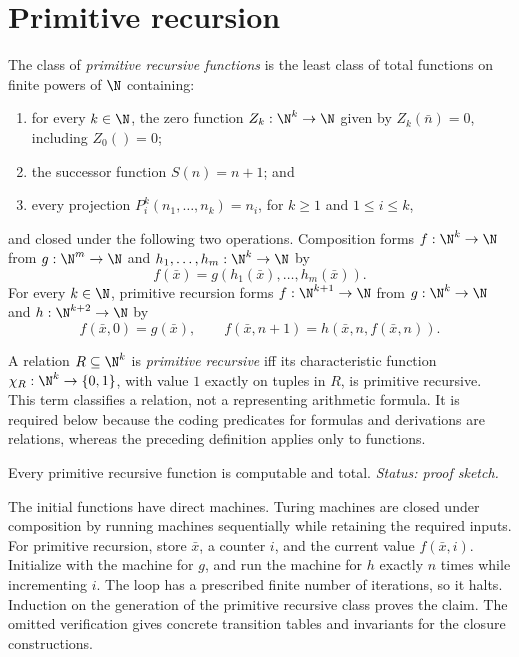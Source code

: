 \section{Primitive recursion}
\label{sec:turing-machines-02}

\begin{definition}
The class of \emph{primitive recursive functions} is the least class of total
functions on finite powers of \(\N\) containing:
\begin{enumerate}
  \item for every \(k\in\N\), the zero function
        \(Z_k:\N^k\to\N\) given by \(Z_k(\bar n)=0\), including
        \(Z_0()=0\);
  \item the successor function \(S(n)=n+1\); and
  \item every projection \(P_i^k(n_1,\ldots,n_k)=n_i\), for
        \(k\geq1\) and \(1\leq i\leq k\),
\end{enumerate}
and closed under the following two operations.  Composition forms
\(f:\N^k\to\N\) from \(g:\N^m\to\N\) and
\(h_1,\ldots,h_m:\N^k\to\N\) by
\[
  f(\bar x)=g(h_1(\bar x),\ldots,h_m(\bar x)).
\]
For every \(k\in\N\), primitive recursion forms
\(f:\N^{k+1}\to\N\) from \(g:\N^k\to\N\) and
\(h:\N^{k+2}\to\N\) by
\[
  f(\bar x,0)=g(\bar x),
  \qquad
  f(\bar x,n+1)=h(\bar x,n,f(\bar x,n)).
\]
\end{definition}

\begin{definition}
A relation \(R\subseteq\N^k\) is \emph{primitive recursive} iff its
characteristic function \(\chi_R:\N^k\to\{0,1\}\), with value \(1\) exactly
on tuples in \(R\), is primitive recursive.  This term classifies a relation,
not a representing arithmetic formula.  It is required below because the
coding predicates for formulas and derivations are relations, whereas the
preceding definition applies only to functions.
\end{definition}

\begin{theorem}
Every primitive recursive function is computable and total.
\textit{Status: proof sketch.}
\end{theorem}

\begin{proofplan}
The initial functions have direct machines.  Turing machines are closed under
composition by running machines sequentially while retaining the required
inputs.  For primitive recursion, store \(\bar x\), a counter \(i\), and the
current value \(f(\bar x,i)\).  Initialize with the machine for \(g\), and run
the machine for \(h\) exactly \(n\) times while incrementing \(i\).  The loop
has a prescribed finite number of iterations, so it halts.  Induction on the
generation of the primitive recursive class proves the claim.
The omitted verification gives concrete transition tables and invariants for
the closure constructions.
\end{proofplan}


